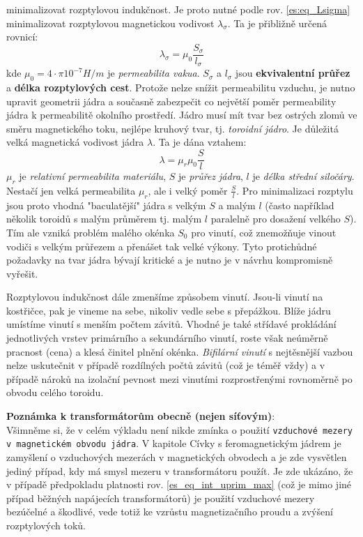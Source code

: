     minimalizovat rozptylovou indukčnost. Je proto nutné podle rov. \ref{es:eq_Lsigma} 
    minimalizovat rozptylovou magnetickou vodivost $\lambda_\sigma$. Ta je přibližně určená rovnicí:
    \begin{equation}\label{es:eq_rozptyl_vodivost}
      \lambda_\sigma= \mu_0\frac{S_\sigma}{l_\sigma}
    \end{equation}
    kde $\mu_0=4\cdot\pi10^{-7}H/m$ je \emph{permeabilita vakua}. $S_\sigma$ a $l_\sigma$ jsou
    \textbf{ekvivalentní průřez} a \textbf{délka rozptylových cest}. Protože nelze snížit  
    permeabilitu vzduchu, je nutno upravit geometrii jádra a současně zabezpečit co největší poměr 
    permeability jádra k permeabilitě okolního prostředí. Jádro musí mít tvar bez ostrých zlomů ve 
    směru magnetického toku, nejlépe kruhový tvar, tj. \emph{toroidní jádro}. Je důležitá velká 
    magnetická vodivost jádra $\lambda$. Ta je dána vztahem:
    \begin{equation}\label{es:eq_vodivost_jadra}
      \lambda= \mu_r\mu_0\frac{S}{l}
    \end{equation}
    $\mu_r$ je \emph{relativní permeabilita materiálu}, $S$ je \emph{průřez jádra}, $l$ je 
    \emph{délka střední siločáry}. Nestačí jen velká permeabilita  $\mu_r$, ale i velký poměr 
    $\frac{S}{l}$. Pro minimalizaci rozptylu jsou proto vhodná "baculatější" jádra s velkým $S$ a 
    malým $l$ (často například několik toroidů s malým průměrem tj. malým $l$ paralelně pro 
    dosažení velkého $S$). Tím ale vzniká problém malého okénka $S_0$ pro vinutí, což znemožňuje 
    vinout vodiči s velkým průřezem a přenášet tak velké výkony. Tyto protichůdné požadavky na tvar 
    jádra bývají kritické a je nutno je v návrhu kompromisně vyřešit.

    Rozptylovou indukčnost dále zmenšíme způsobem vinutí. Jsou-li vinutí na kostřičce, pak je 
    vineme na sebe, nikoliv vedle sebe s přepážkou. Blíže jádru umístíme vinutí s menším počtem 
    závitů. Vhodné je také střídavé prokládání jednotlivých vrstev primárního a sekundárního 
    vinutí, roste však neúměrně pracnost (cena) a klesá činitel plnění okénka. \emph{Bifilární 
    vinutí} s nejtěsnější vazbou nelze uskutečnit v případě rozdílných počtů závitů (což je téměř 
    vždy) a v případě nároků na izolační pevnost mezi vinutími rozprostřenými rovnoměrně po obvodu 
    celého toroidu.

    \begin{tcnote}
      \textbf{Poznámka k transformátorům obecně (nejen síťovým)}:
      \\ Všimněme si, že v celém výkladu není nikde zmínka o použití \texttt{vzduchové mezery 
      v 
      magnetickém obvodu jádra}. V kapitole Cívky s feromagnetickým jádrem je zamyšlení o 
      vzduchových mezerách v magnetických obvodech a je zde vysvětlen jediný případ, kdy má smysl 
      mezeru v transformátoru použít. Je zde ukázáno, že v případě předpokladu platnosti rov. 
      \ref{es_eq_int_uprim_max} (což je mimo jiné případ běžných napájecích transformátorů) je 
      použití vzduchové mezery bezúčelné a škodlivé, vede totiž ke vzrůstu magnetizačního proudu a 
      zvýšení rozptylových toků.
    \end{tcnote}

